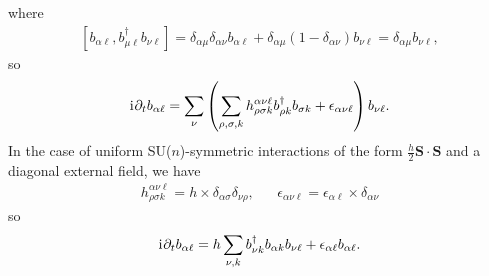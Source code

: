 \documentclass[nofootinbib,twocolumn]{revtex4-2}
\newcommand{\p}[1]{\left(#1\right)} %
\renewcommand{\sp}[1]{\left[#1\right]} %
\renewcommand{\v}{\bm} %
\renewcommand{\c}{\cdot} %
\renewcommand{\d}{\partial} %
\renewcommand{\i}{\mathrm{i}\mkern1mu} %
\newcommand{\1}{\mathds{1}}
\begin{document}
where
\begin{align}
  \sp{b_{\alpha\ell}, b_{\mu\ell}^\dag b_{\nu\ell}}
  = \delta_{\alpha\mu} \delta_{\alpha\nu} b_{\alpha\ell}
  + \delta_{\alpha\mu} \p{1-\delta_{\alpha\nu}} b_{\nu\ell}
  = \delta_{\alpha\mu} b_{\nu\ell},
\end{align}
so
\begin{align}
  \i \d_t b_{\alpha\ell}
  = \sum_\nu \p{\sum_{\rho,\sigma,k}
    h^{\alpha\nu\ell}_{\rho\sigma k} b_{\rho k}^\dag b_{\sigma k}
    + \epsilon_{\alpha\nu\ell}} b_{\nu\ell}.
\end{align}
In the case of uniform SU($n$)-symmetric interactions of the form $\frac{h}{2}\v S\c\v S$ and a diagonal external field, we have
\begin{align}
  h^{\alpha\nu\ell}_{\rho\sigma k}
  = h \times \delta_{\alpha\sigma} \delta_{\nu\rho},
  &&
  \epsilon_{\alpha\nu\ell}
  = \epsilon_{\alpha\ell} \times \delta_{\alpha\nu}
\end{align}
so
\begin{align}
  \i \d_t b_{\alpha\ell}
  = h \sum_{\nu,k} b_{\nu k}^\dag b_{\alpha k} b_{\nu\ell}
  + \epsilon_{\alpha\ell} b_{\alpha\ell}.
\end{align}
\end{document}
